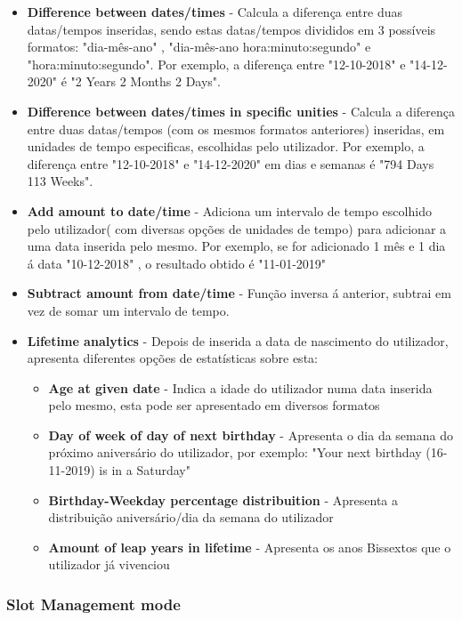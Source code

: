 \documentclass{article}
\begin{document}
\begin{itemize}
    \item \textbf{Difference between dates/times} - Calcula a diferença entre duas datas/tempos inseridas, sendo estas datas/tempos divididos em 3 possíveis formatos: "dia-mês-ano" ,  "dia-mês-ano hora:minuto:segundo" e\\ "hora:minuto:segundo". Por exemplo, a diferença entre "12-10-2018" e "14-12-2020" é "2 Years 2 Months 2 Days".
    \item \textbf{Difference between dates/times in specific unities} - Calcula a diferença entre duas datas/tempos (com os mesmos formatos anteriores) inseridas, em unidades de tempo especificas, escolhidas pelo utilizador. Por exemplo, a diferença entre "12-10-2018" e "14-12-2020" em dias e semanas é "794 Days 113 Weeks". 
    \item \textbf{Add amount to date/time} - Adiciona um intervalo de tempo escolhido pelo utilizador( com diversas opções de unidades de tempo) para adicionar a uma data inserida pelo mesmo. Por exemplo, se for adicionado 1 mês e 1 dia  á data "10-12-2018" , o resultado obtido é  "11-01-2019"
    \item \textbf{Subtract amount from date/time} - Função inversa á anterior, subtrai em vez de somar um intervalo de tempo.
    \item \textbf{Lifetime analytics} - Depois de  inserida a data de nascimento do utilizador, apresenta diferentes opções de estatísticas sobre esta:
        \begin{itemize}
        \item \textbf{Age at given date} - Indica a idade do utilizador numa data inserida pelo mesmo, esta pode ser apresentado em diversos formatos
        \item \textbf{Day of week of day of next birthday} - Apresenta o dia da semana do próximo aniversário do utilizador, por exemplo: "Your next birthday (16-11-2019) is in a Saturday"
        \item \textbf{Birthday-Weekday percentage distribuition} - Apresenta a distribuição aniversário/dia da semana do utilizador  
        \item \textbf{Amount of leap years in lifetime} - Apresenta os anos Bissextos que o utilizador já vivenciou
        \end{itemize}
        
    
\end{itemize}

\subsubsection{Slot Management mode}
\end{document}
